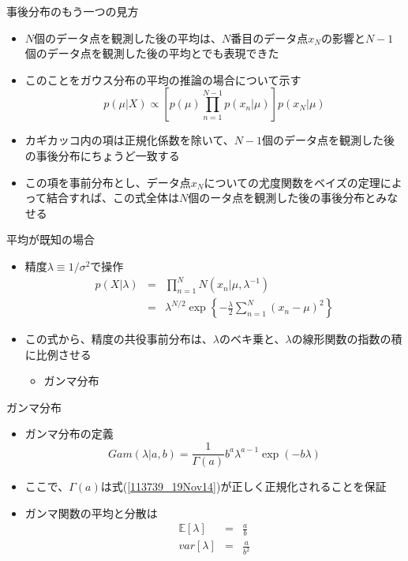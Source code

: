 \begin{frame}{事後分布のもう一つの見方}
 \begin{itemize}
  \item $N$個のデータ点を観測した後の平均は、$N$番目のデータ点$x_N$の影響と$N-1$個のデータ点を観測した後の平均とでも表現できた
  \item このことをガウス分布の平均の推論の場合について示す
        \begin{equation}
         p(\mu|X) \propto \left[p(\mu)\prod_{n=1}^{N-1}p(x_n|\mu)\right]p(x_N|\mu)
        \end{equation}
  \item カギカッコ内の項は正規化係数を除いて、$N-1$個のデータ点を観測した後の事後分布にちょうど一致する
  \item この項を事前分布とし、データ点$x_N$についての尤度関数をベイズの定理によって結合すれば、この式全体は$N$個のータ点を観測した後の事後分布とみなせる
 \end{itemize}
\end{frame}

\begin{frame}{平均が既知の場合}
 \begin{itemize}
  \item 精度$\lambda\equiv 1/\sigma^2$で操作
        \begin{eqnarray}
         p(X|\lambda) &=& \prod_{n=1}^{N}N(x_n|\mu,\lambda^{-1}) \nonumber \\
         &=& \lambda^{N/2}\exp\left\{-\frac{\lambda}{2}\sum_{n=1}^{N}(x_n-\mu)^2\right\}\label{114403_19Nov14}
        \end{eqnarray}
  \item この式から、精度の共役事前分布は、$\lambda$のベキ乗と、$\lambda$の線形関数の指数の積に比例させる
        \begin{itemize}
         \item \alert{ガンマ分布}
        \end{itemize}
 \end{itemize}
\end{frame}


\begin{frame}{ガンマ分布}
 \begin{itemize}
  \item ガンマ分布の定義
        \begin{equation}
         Gam(\lambda|a,b) = \frac{1}{\Gamma(a)}b^a\lambda^{a-1}\exp(-b\lambda)\label{113739_19Nov14}
        \end{equation}
  \item ここで、$\Gamma(a)$は式(\ref{113739_19Nov14})が正しく正規化されることを保証
  \item ガンマ関数の平均と分散は
        \begin{eqnarray}
         \mathbb{E}[\lambda] &=& \frac{a}{b}\\
         var[\lambda]& =& \frac{a}{b^2}
        \end{eqnarray}
 \end{itemize}
\end{frame}

